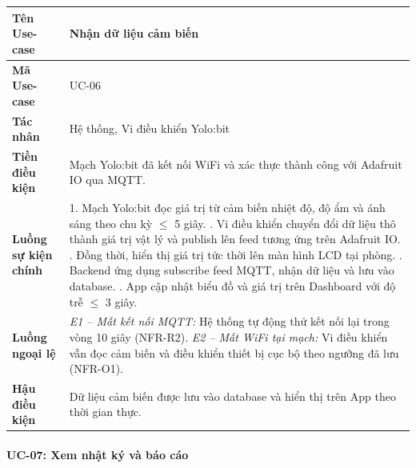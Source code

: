 \begin{table}[H]
\centering
\renewcommand{\arraystretch}{1.4}
\begin{tabular}{|p{3.8cm}|p{10cm}|}
\hline
\textbf{Tên Use-case}       & Nhận dữ liệu cảm biến \\ \hline
\textbf{Mã Use-case}        & UC-06 \\ \hline
\textbf{Tác nhân}           & Hệ thống, Vi điều khiển Yolo:bit \\ \hline
\textbf{Tiền điều kiện}     & Mạch Yolo:bit đã kết nối WiFi và xác thực thành công với Adafruit IO qua MQTT. \\ \hline
\textbf{Luồng sự kiện chính} & 
1. Mạch Yolo:bit đọc giá trị từ cảm biến nhiệt độ, độ ẩm và ánh sáng theo chu kỳ $\leq$ 5 giây. \newline
2. Vi điều khiển chuyển đổi dữ liệu thô thành giá trị vật lý và publish lên feed tương ứng trên Adafruit IO. \newline
3. Đồng thời, hiển thị giá trị tức thời lên màn hình LCD tại phòng. \newline
4. Backend ứng dụng subscribe feed MQTT, nhận dữ liệu và lưu vào database. \newline
5. App cập nhật biểu đồ và giá trị trên Dashboard với độ trễ $\leq$ 3 giây. \\ \hline
\textbf{Luồng ngoại lệ}     & 
\textit{E1 -- Mất kết nối MQTT:} Hệ thống tự động thử kết nối lại trong vòng 10 giây (NFR-R2). \newline
\textit{E2 -- Mất WiFi tại mạch:} Vi điều khiển vẫn đọc cảm biến và điều khiển thiết bị cục bộ theo ngưỡng đã lưu (NFR-O1). \\ \hline
\textbf{Hậu điều kiện}      & Dữ liệu cảm biến được lưu vào database và hiển thị trên App theo thời gian thực. \\ \hline
\end{tabular}
\end{table}

\paragraph{UC-07: Xem nhật ký và báo cáo}

